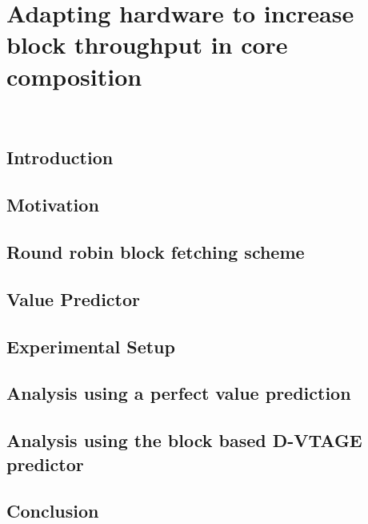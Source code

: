 \chapter{Adapting hardware to increase block throughput in core composition}~\label{chp:hardchanges}

\section{Introduction}\label{sect:introduction-chapter3}

\section{Motivation}\label{sect:ch3-motivation}

\section{Round robin block fetching scheme}\label{chp3:sec:fetch}

\section{Value Predictor}
\label{chp3:sec:val}
\section{Experimental Setup}
\label{chp:chp3:sec:exp}
\section{Analysis using a perfect value prediction}\label{chp:chp3:sec:analysis}

\section{Analysis using the block based D-VTAGE predictor}
\label{chp:chp3:sec:analysis2}
\section{Conclusion}

%
%